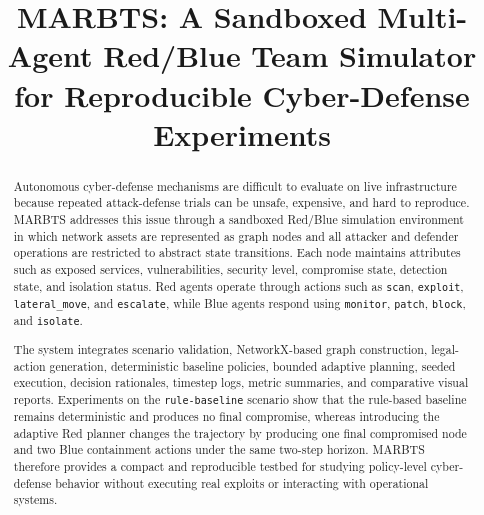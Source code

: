 \documentclass[conference]{IEEEtran}
\begin{document}
\title{MARBTS: A Sandboxed Multi-Agent Red/Blue Team Simulator for Reproducible Cyber-Defense Experiments}

\author{
}
\maketitle

\begin{abstract}
Autonomous cyber-defense mechanisms are difficult to evaluate on live infrastructure because repeated attack-defense trials can be unsafe, expensive, and hard to reproduce. MARBTS addresses this issue through a sandboxed Red/Blue simulation environment in which network assets are represented as graph nodes and all attacker and defender operations are restricted to abstract state transitions. Each node maintains attributes such as exposed services, vulnerabilities, security level, compromise state, detection state, and isolation status. Red agents operate through actions such as \texttt{scan}, \texttt{exploit}, \texttt{lateral\_move}, and \texttt{escalate}, while Blue agents respond using \texttt{monitor}, \texttt{patch}, \texttt{block}, and \texttt{isolate}.

The system integrates scenario validation, NetworkX-based graph construction, legal-action generation, deterministic baseline policies, bounded adaptive planning, seeded execution, decision rationales, timestep logs, metric summaries, and comparative visual reports. Experiments on the \texttt{rule-baseline} scenario show that the rule-based baseline remains deterministic and produces no final compromise, whereas introducing the adaptive Red planner changes the trajectory by producing one final compromised node and two Blue containment actions under the same two-step horizon. MARBTS therefore provides a compact and reproducible testbed for studying policy-level cyber-defense behavior without executing real exploits or interacting with operational systems.
\end{abstract}
\end{document}
